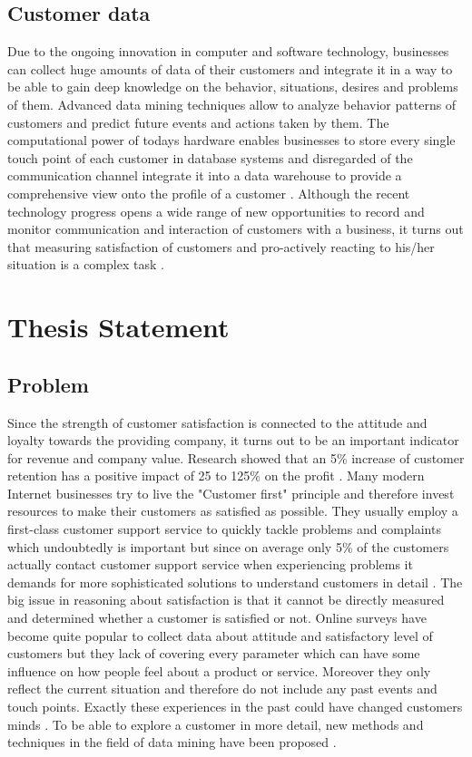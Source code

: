 \subsection{Customer data}
Due to the ongoing innovation in computer and software technology, businesses can collect huge amounts of data of their customers and integrate it in a way to be able to gain deep knowledge on the behavior, situations, desires and problems of them. Advanced data mining techniques allow to analyze behavior patterns of customers and predict future events and actions taken by them. The computational power of todays hardware enables businesses to store every single touch point of each customer in database systems and disregarded of the communication channel integrate it into a data warehouse to provide a comprehensive view onto the profile of a customer \cite{chen2003understanding}. Although the recent technology progress opens a wide range of new opportunities to record and monitor communication and interaction of customers with a business, it turns out that measuring satisfaction of customers and pro-actively reacting to his/her situation is a complex task \cite{neckel2015}.

\section{Thesis Statement}

\subsection{Problem}
Since the strength of customer satisfaction is connected to the attitude and loyalty towards the providing company, it turns out to be an important indicator for revenue and company value. Research showed that an 5\% increase of customer retention has a positive impact of 25 to 125\% on the profit \cite{bowen2001relationship}. Many modern Internet businesses try to live the "Customer first" principle and therefore invest resources to make their customers as satisfied as possible. They usually employ a first-class customer support service to quickly tackle problems and complaints which undoubtedly is important but since on average only 5\% of the customers actually contact customer support service when experiencing problems it demands for more sophisticated solutions to understand customers in detail \cite{neckel2015}. The big issue in reasoning about satisfaction is that it cannot be directly measured and determined whether a customer is satisfied or not. Online surveys have become quite popular to collect data about attitude and satisfactory level of customers but they lack of covering every parameter which can have some influence on how people feel about a product or service. Moreover they only reflect the current situation and therefore do not include any past events and touch points. Exactly these experiences in the past could have changed customers minds \cite{neckel2015}. To be able to explore a customer in more detail, new methods and techniques in the field of data mining have been proposed \cite{neckel2015}. 

